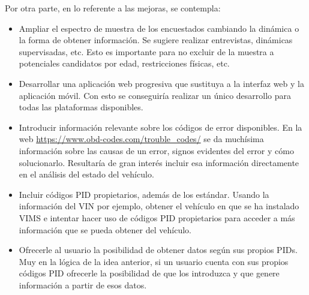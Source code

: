 Por otra parte, en lo referente a las mejoras, se contempla:

\begin{itemize}
  \item Ampliar el espectro de muestra de los encuestados cambiando la dinámica
        o la forma de obtener información. Se sugiere realizar entrevistas,
        dinámicas supervisadas, etc. Esto es importante para no excluir de la
        muestra a potenciales candidatos por edad, restricciones físicas, etc.
  \item Desarrollar una aplicación web progresiva que sustituya a la interfaz
        web y la aplicación móvil. Con esto se conseguiría realizar un único
        desarrollo para todas las plataformas disponibles.
  \item Introducir información relevante sobre los códigos de error disponibles.
        En la web \url{https://www.obd-codes.com/trouble_codes/} se da muchísima
        información sobre las causas de un error, signos evidentes del error y
        cómo solucionarlo. Resultaría de gran interés incluir esa información
        directamente en el análisis del estado del vehículo.
  \item Incluir códigos \ac{PID} propietarios, además de los estándar. Usando
        la información del \ac{VIN} por ejemplo, obtener el vehículo en que se
        ha instalado \ac{VIMS} e intentar hacer uso de códigos \ac{PID} propietarios
        para acceder a más información que se pueda obtener del vehículo.
  \item Ofrecerle al usuario la posibilidad de obtener datos según sus propios
        \ac{PID}s. Muy en la lógica de la idea anterior, si un usuario cuenta
        con sus propios códigos \ac{PID} ofrecerle la posibilidad de que los
        introduzca y que genere información a partir de esos datos.
\end{itemize}
